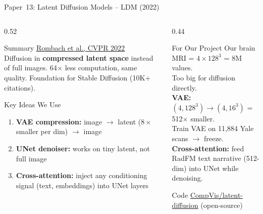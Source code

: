 \documentclass[aspectratio=169,xcolor=dvipsnames]{beamer}
\begin{document}
\begin{frame}{Paper~13: Latent Diffusion Models -- LDM (2022)}
    \begin{columns}
        \begin{column}{0.52\textwidth}
            \begin{block}{Summary}
                \small
                \href{https://arxiv.org/abs/2112.10752}{Rombach et al., CVPR 2022}\\[0.3em]
                Diffusion in \textbf{compressed latent space} instead of full images. 64$\times$ less computation, same quality. Foundation for Stable Diffusion (10K+ citations).
            \end{block}

            \vspace{0.2em}

            \begin{block}{Key Ideas We Use}
                \small
                \begin{enumerate}
                    \item \textbf{VAE compression:} image $\to$ latent ($8{\times}$ smaller per dim) $\to$ image
                    \item \textbf{UNet denoiser:} works on tiny latent, not full image
                    \item \textbf{Cross-attention:} inject any conditioning signal (text, embeddings) into UNet layers
                \end{enumerate}
            \end{block}
        \end{column}

        \begin{column}{0.44\textwidth}
            \begin{alertblock}{For Our Project}
                \small
                Our brain MRI = $4{\times}128^3$ = 8M values.\\
                Too big for diffusion directly.\\[0.2em]
                \textbf{VAE:} $(4,128^3) \to (4,16^3)$ = 512$\times$ smaller.\\
                Train VAE on 11,884 Yale scans $\to$ freeze.\\[0.2em]
                \textbf{Cross-attention:} feed RadFM text narrative (512-dim) into UNet while denoising.
            \end{alertblock}

            \vspace{0.2em}

            \begin{exampleblock}{\scriptsize {} Code}
                \scriptsize \href{https://github.com/CompVis/latent-diffusion}{CompVis/latent-diffusion} (open-source)
            \end{exampleblock}
        \end{column}
    \end{columns}
\end{frame}
\end{document}
